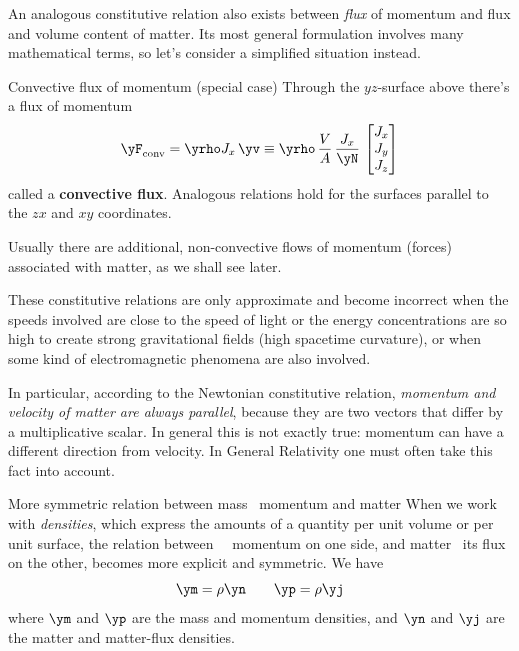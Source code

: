 \bigskip

An analogous constitutive relation also exists between \emph{flux} of momentum and flux and volume content of matter. Its most general formulation involves many mathematical terms, so let's consider a simplified situation instead.
\begin{definition}{Convective flux of momentum (special case)}
Through the $yz$-surface above there's a flux of momentum
  \begin{equation}
    \label{neq:matterflux_force_Newton}
    \yF_{\text{conv}} = \yrho J_{x}\,\yv \equiv
    \yrho\, \frac{V}{A}\,\frac{J_{x}}{\yN}\,
  \begin{bmatrix}
    J_{x}\\J_{y}\\J_{z}
  \end{bmatrix}
  \end{equation}
  called a \textbf{convective flux}. Analogous relations hold for the surfaces parallel to the $zx$ and $xy$ coordinates.
\end{definition}
\begin{warning}
  Usually there are additional, non-convective flows of momentum (forces) associated with matter, as we shall see later.
\end{warning}

These constitutive relations are only approximate and become incorrect when the speeds involved are close to the speed of light or the energy concentrations are so high to create strong gravitational fields (high spacetime curvature), or when some kind of electromagnetic phenomena are also involved.

In particular, according to the Newtonian constitutive relation, \emph{momentum and velocity of matter are always parallel}, because they are two vectors that differ by a multiplicative scalar. In general this is not exactly true: momentum can have a different direction from velocity. In General Relativity one must often take this fact into account.

\begin{extra}{More symmetric relation between mass \amp\ momentum and matter}
  When we work with \emph{densities}, which express the amounts of a quantity per unit volume or per unit surface, the relation between \masse\ \amp\ momentum on one side, and matter \amp\ its flux on the other, becomes more explicit and symmetric. We have
  \begin{equation*}
    \ym = \rho\yn \qquad \yp = \rho\yj
  \end{equation*}
  where $\ym$ and $\yp$ are the mass and momentum densities, and $\yn$ and $\yj$ are the matter and matter-flux densities.
\end{extra}


